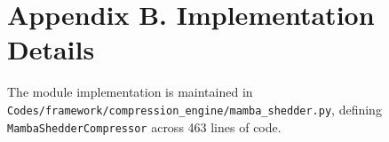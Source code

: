 \section*{Appendix B. Implementation Details}
The module implementation is maintained in \texttt{Codes/framework/compression\_engine/mamba\_shedder.py}, defining \texttt{MambaShedderCompressor} across 463 lines of code.
